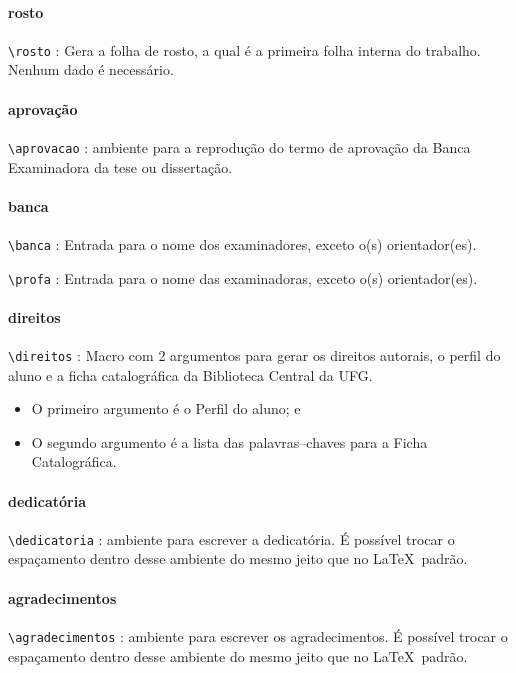 \paragraph{rosto\\}
\verb|\rosto| : Gera a folha de rosto, a qual é a primeira folha interna do trabalho. Nenhum dado é necessário.

\paragraph{aprovação\\}
\verb|\aprovacao| : ambiente para a reprodução do termo de aprovação da Banca Examinadora da tese ou dissertação.

\paragraph{banca\\}
\verb|\banca| : Entrada para o nome dos examinadores, exceto o(s) orientador(es).

\noindent\verb|\profa| : Entrada para o nome das examinadoras, exceto o(s) orientador(es).

\paragraph{direitos\\}
\verb|\direitos| : Macro com 2 argumentos para gerar os direitos autorais, o perfil do aluno e a ficha catalográfica da Biblioteca Central da UFG.
\begin{itemize}
\item O primeiro argumento é o Perfil do aluno; e
\item O segundo argumento é a lista das palavras--chaves para a Ficha Catalográfica.
\end{itemize}

\paragraph{dedicatória\\}
\verb|\dedicatoria| : ambiente para escrever a dedicatória. É possível trocar o espaçamento dentro desse ambiente do mesmo jeito que no \LaTeX\ padrão.

\paragraph{agradecimentos\\}
\verb|\agradecimentos| : ambiente para escrever os agradecimentos. É possível trocar o espaçamento dentro desse ambiente do mesmo jeito que no \LaTeX\ padrão.

